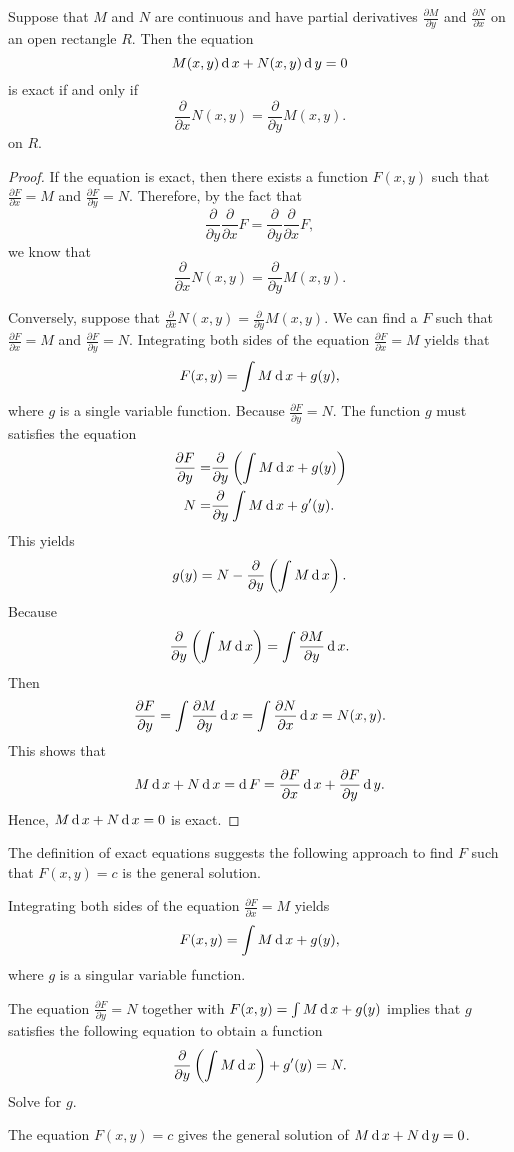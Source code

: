 \begin{theorem}\label{thm:exactness}
  Suppose that $M$ and $N$ are continuous and have partial derivatives $\frac{\partial M}{\partial y}$ and $\frac{\partial N}{\partial x}$ on an open rectangle $R$. Then the equation 
  \[M(x,y) \operatorname{d} x +  N(x,y) \operatorname{d} y=0\]
	is exact if and only if 
	\[\frac{\partial}{\partial x}N(x,y) =\frac{\partial}{\partial y} M(x,y).\]
  on $R$.
\end{theorem}
\begin{proof}
  If the equation is exact, then there exists a function $F(x, y)$ such that $\frac{\partial F}{\partial x}=M$ and $\frac{\partial F}{\partial y}=N$. Therefore, by the fact that 
  \[\frac{\partial}{\partial y}\frac{\partial}{\partial x}F=\frac{\partial}{\partial y}\frac{\partial}{\partial x}F,\]
  we know that 
  \[\frac{\partial}{\partial x}N(x,y) =\frac{\partial}{\partial y} M(x,y).\]

  Conversely, suppose that $\frac{\partial}{\partial x}N(x,y) =\frac{\partial}{\partial y} M(x,y)$. We can find a $F$ such that $\frac{\partial F}{\partial x}=M$ and $\frac{\partial F}{\partial y}=N$.
  Integrating both sides of the equation $\frac{\partial F}{\partial x}=M$ yields that
  \[F(x, y)=\int M \operatorname{d} x+g(y),\]
  where $g$ is a single variable function.
  Because $\frac{\partial F}{\partial y}=N$. The function $g$ must satisfies the equation
  \[
    \begin{aligned}
      \frac{\partial F}{\partial y}=&\frac{\partial }{\partial y}\left(\int M \operatorname{d} x+g(y)\right)\\
      N=&\frac{\partial}{\partial y}\int M \operatorname{d} x + g'(y).
    \end{aligned}
    \]
   This yields 
    \[g(y)=N-\frac{\partial}{\partial y}\left(\int M \operatorname{d} x\right).\]
  Because 
  \[\frac{\partial}{\partial y}\left(\int M \operatorname{d} x\right)=\int \frac{\partial M}{\partial y} \operatorname{d} x.\]
  Then 
  \[\frac{\partial F}{\partial y}=\int \frac{\partial M}{\partial y}\operatorname{d} x=\int \frac{\partial N}{\partial x}\operatorname{d} x=N(x, y).\]
  This shows that 
  \[M\operatorname{d} x + N\operatorname{d} x=\operatorname{d} F =\frac{\partial F}{\partial x}\operatorname{d} x+\frac{\partial F}{\partial y}\operatorname{d} y.\]
  Hence, $M\operatorname{d} x + N\operatorname{d} x=0$ is exact. 
\end{proof}

The definition of exact equations suggests the following approach to find $F$ such that $F(x, y)=c$ is the general solution.
\begin{steps}
  \item Integrating both sides of the equation $\frac{\partial F}{\partial x}=M$ yields
  \[F(x, y)=\int M\operatorname{d} x + g(y),\]
  where $g$ is a singular variable function.
  \item The equation $\frac{\partial F}{\partial y}=N$ together with $F(x, y)=\int M\operatorname{d} x + g(y)$ implies that $g$ satisfies the following equation to obtain a function
  \[\frac{\partial}{\partial y}\left(\int M\operatorname{d} x\right)+g'(y)=N.\] Solve for $g$.
  \item The equation $F(x, y)=c$ gives the general solution of $M\operatorname{d} x + N\operatorname{d} y=0$.
\end{steps}

